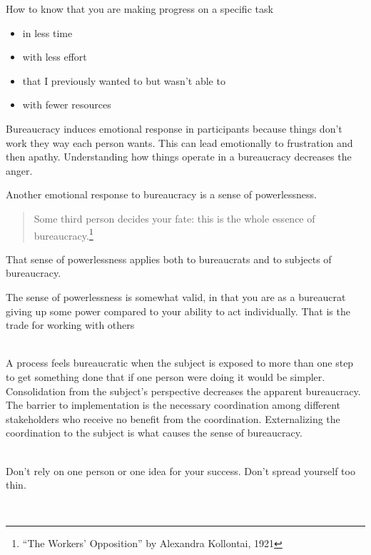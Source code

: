 How to know that you are making progress on a specific task
\begin{itemize}
    \item in less time
    \item with less effort
    \item that I previously wanted to but wasn't able to
    \item with fewer resources
\end{itemize}



Bureaucracy induces emotional response in participants because things don't work they way each person wants. This can lead emotionally to frustration and then apathy. Understanding how things operate in a bureaucracy decreases the anger.


Another emotional response to bureaucracy is a sense of powerlessness. 
\begin{quote}
Some third person decides your fate: this is the whole essence of bureaucracy.\footnote{``The Workers' Opposition'' by Alexandra Kollontai, 1921}
\end{quote}
That sense of powerlessness applies both to bureaucrats and to subjects of bureaucracy. 

The sense of powerlessness is somewhat valid, in that you are as a bureaucrat giving up some power compared to your ability to act individually. That is the trade for working with others

\ \\

A process feels bureaucratic when the subject is exposed to more than one step to get something done that if one person were doing it would be simpler. Consolidation from the subject's perspective decreases the apparent bureaucracy. The barrier to implementation is the necessary coordination among different stakeholders who receive no benefit from the coordination. Externalizing the coordination to the subject is what causes the sense of bureaucracy. 


\ \\

Don't rely on one person or one idea for your success. Don't spread yourself too thin. 

\ \\

